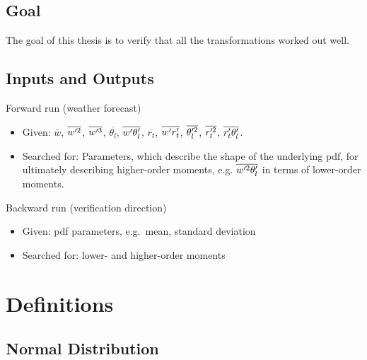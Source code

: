 \documentclass[10pt]{beamer}
\numberwithin{equation}{section}
\begin{document}
    \subsection{Goal}\label{subsec:goal}

    \begin{frame}
        The goal of this thesis is to verify that all the transformations worked out well.
    \end{frame}

    \subsection{Inputs and Outputs}\label{subsec:inputs-and-outputs}

    \begin{frame}{Forward run (weather forecast)}
        \begin{itemize}
            [<+->]
            \item Given: $\overline{w}$, $\overline{w'^2}$, $\overline{w'^3}$, $\overline{\theta_l}$, $\overline{w' \theta_l'}$,
            $\overline{r_t}$, $\overline{w' r_t'}$, $\overline{\theta_l'^2}$, $\overline{r_t'^2}$, $\overline{r_t' \theta_l'}$.
            \item Searched for: Parameters, which describe the shape of the underlying pdf,
            for ultimately describing higher-order moments,
            e.g. $\overline{w'^2 \theta_l'}$ in terms of lower-order moments.
        \end{itemize}
    \end{frame}

    \begin{frame}{Backward run (verification direction)}
        \begin{itemize}
            [<+->]
            \item Given: pdf parameters, e.g.\ mean, standard deviation
            \item Searched for: lower- and higher-order moments
        \end{itemize}
    \end{frame}


    \section{Definitions}\label{sec:definitions}

    \subsection{Normal Distribution}\label{subsec:normal-distribution}
\end{document}
